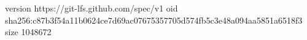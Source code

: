 version https://git-lfs.github.com/spec/v1
oid sha256:c87b3f54a11b0624ce7d69ac07675357705d574fb5c3e48a094aa5851a6518f3
size 1048672

